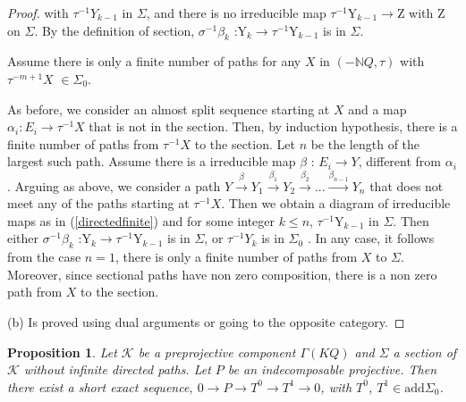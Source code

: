 \documentclass{amsart}
\theoremstyle{plain}
\newtheorem{proposition}{Proposition}
\numberwithin{equation}{section}
\begin{document}
\begin{proof}
with $\tau ^{-1}Y_{k-1}$ in $\Sigma $, and there is no irreducible map $\tau
^{-1}$Y$_{k-1}\rightarrow $Z with Z on $\Sigma $. By the definition of
section, $\sigma ^{-1}\beta _{k}$ :Y$_{k}\rightarrow \tau ^{-1}$Y$_{k-1}$ is
in $\Sigma $.

Assume there is only a finite number of paths for any $X$ in $(-\mathbb{N}Q,\tau )$ with $\tau ^{-m+1}X$ $\in \Sigma _{0}.$

As before, we consider an almost split sequence starting at $X$ and a map $\alpha _{i}:E_{i}\rightarrow \tau ^{-1}X$ that is not in the section. Then,
by induction hypothesis, there is a finite number of paths from $\tau ^{-1}X
$ to the section. Let $n$ be the length of the largest such path. Assume
there is a irreducible map $\beta $ : $E_{i}\rightarrow Y$, different from $\alpha _{i}$. Arguing as above, we consider a path $Y\overset{\beta }{\rightarrow }Y_{1}\overset{\beta _{1}}{\rightarrow }Y_{2}\overset{\beta _{2}}{\rightarrow }...\overset{\beta _{n-1}}{\rightarrow }Y_{n}$ that does not
meet any of the paths starting at $\tau ^{-1}X$. Then we obtain a diagram of
irreducible maps as in (\ref{directedfinite}) and for some integer $k\leq n$, $\tau ^{-1}$Y$_{k-1}$ in $\Sigma .$ Then either $\sigma ^{-1}\beta _{k}$ :Y$_{k}\rightarrow \tau ^{-1}$Y$_{k-1}$ is in $\Sigma $, or $\tau ^{-1}Y_{k}$
is in $\Sigma _{0}$ . In any case, it follows from the case $n=1$, there is
only a finite number of paths from $X$ to $\Sigma .$ Moreover, since
sectional paths have non zero composition, there is a non zero path from $X$
to the section.

(b) Is proved using dual arguments or going to the opposite category.
\end{proof}

\begin{proposition}
\label{herin1} Let $\mathcal{K}$ be a preprojective component $\Gamma (KQ)$
and $\Sigma $ a section of $\mathcal{K}$ without infinite directed paths.
Let $P$ be an indecomposable projective. Then there exist a short exact
sequence, $0\rightarrow P\rightarrow T^{0}\rightarrow T^{1}\rightarrow 0$,
with $T^{0}$, $T^{1}\in \mathrm{add}\Sigma _{0}$.
\end{proposition}
\end{document}
